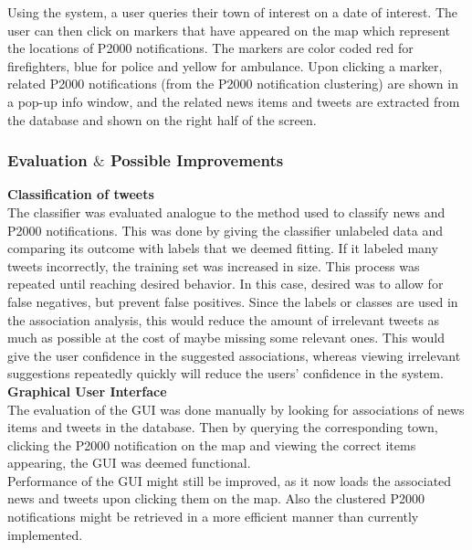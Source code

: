 Using the system, a user queries their town of interest on a date of interest. The user can then click on markers that have appeared on the map which represent the locations of P2000 notifications. The markers are color coded red for firefighters, blue for police and yellow for ambulance. Upon clicking a marker, related P2000 notifications (from the P2000 notification clustering) are shown in a pop-up info window, and the related news items and tweets are extracted from the database and shown on the right half of the screen. \\


\subsubsection*{Evaluation $\&$ Possible Improvements}
\textbf{Classification of tweets}\\
The classifier was evaluated analogue to the method used to classify news and P2000 notifications. This was done by giving the classifier unlabeled data and comparing its outcome with labels that we deemed fitting. If it labeled many tweets incorrectly, the training set was increased in size. This process was repeated until reaching desired behavior. In this case, desired was to allow for false negatives, but prevent false positives. Since the labels or classes are used in the association analysis, this would reduce the amount of irrelevant tweets as much as possible at the cost of maybe missing some relevant ones. This would give the user confidence in the suggested associations, whereas viewing irrelevant suggestions repeatedly quickly will reduce the users' confidence in the system.\\

\textbf{Graphical User Interface}\\
The evaluation of the GUI was done manually by looking for associations of news items and tweets in the database. Then by querying the corresponding town, clicking the P2000 notification on the map and viewing the correct items appearing, the GUI was deemed functional. \\

Performance of the GUI might still be improved, as it now loads the associated news and tweets upon clicking them on the map. Also the clustered P2000 notifications might be retrieved in a more efficient manner than currently implemented.
